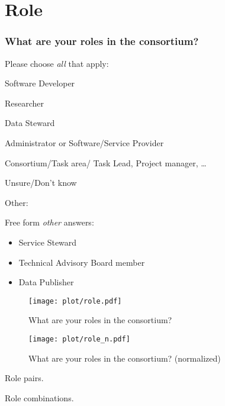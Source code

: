\documentclass[headsepline,titlepage,twoside,12pt,toc=flat,headings=normal]{scrreprt}
\newcommand{\question}[1]{\subsubsection{#1}}
\newcommand{\otherbox}{\fbox{\phantom{This is how big an answer would be.}}}
\begin{document}
\clearpage
\section{Role}

\question{What are your roles in the consortium?}
Please choose \emph{all} that apply:

\begin{answers}
\item Software Developer
\item Researcher
\item Data Steward
\item Administrator or Software/Service Provider
\item Consortium/Task area/ Task Lead, Project manager, \ldots{}
\item Unsure/Don't know
\item Other: \otherbox
\end{answers}

Free form \emph{other} answers:
\begin{itemize}
\item Service Steward
\item Technical Advisory Board member
\item Data Publisher
\end{itemize}
\clearpage

\begin{figure}[h!]
\caption{What are your roles in the consortium?}
\label{fig:role}
\texttt{[image: plot/role.pdf]}
\end{figure}

\begin{figure}[h!]
\caption{What are your roles in the consortium? (normalized)}
\label{fig:role_n}
\texttt{[image: plot/role\_n.pdf]}
\end{figure}

\begin{table}[h!]
\caption{Role pairs.}
\label{tab:role_pairs}

\end{table}

\begin{table}[h!]
\caption{Role combinations.}
\label{tab:role_combinations}

\end{table}


\clearpage
\end{document}
